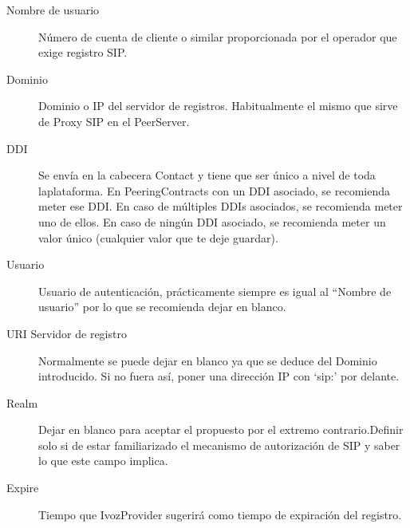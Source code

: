 \documentclass[letterpaper,10pt,spanish]{sphinxmanual}
\begin{document}
\noindent{}
\begin{description}
\item[{Nombre de usuario}] \leavevmode{}\label{external_incoming_calls/peering_contracts:term-username}
Número de cuenta de cliente o similar proporcionada por el operador que exige registro SIP.

\item[{Dominio}] \leavevmode{}\label{external_incoming_calls/peering_contracts:term-domain}
Dominio o IP del servidor de registros. Habitualmente el mismo que sirve de Proxy SIP en el PeerServer.

\item[{DDI}] \leavevmode{}\label{external_incoming_calls/peering_contracts:term-ddi}
Se envía en la cabecera Contact y tiene que ser único a nivel de toda laplataforma. En PeeringContracts con un DDI asociado, se recomienda meter ese DDI. En caso de múltiples DDIs asociados, se recomienda meter uno de ellos. En caso de ningún DDI asociado, se recomienda meter un valor único (cualquier valor que te deje guardar).

\item[{Usuario}] \leavevmode{}\label{external_incoming_calls/peering_contracts:term-user}
Usuario de autenticación, prácticamente siempre es igual al ``Nombre de usuario'' por lo que se recomienda dejar en blanco.

\item[{URI Servidor de registro}] \leavevmode{}\label{external_incoming_calls/peering_contracts:term-register-server-uri}
Normalmente se puede dejar en blanco ya que se deduce del Dominio introducido. Si no fuera así, poner una dirección IP con `sip:' por delante.

\item[{Realm}] \leavevmode{}\label{external_incoming_calls/peering_contracts:term-realm}
Dejar en blanco para aceptar el propuesto por el extremo contrario.Definir solo si de estar familiarizado el mecanismo de autorización de SIP y saber lo que este campo implica.

\item[{Expire}] \leavevmode{}\label{external_incoming_calls/peering_contracts:term-expire}
Tiempo que IvozProvider sugerirá como tiempo de expiración del registro.

\end{description}
\end{document}
